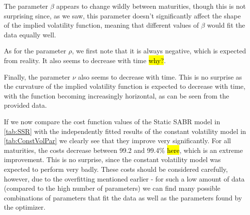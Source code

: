 The parameter $\beta$ appears to change wildly between maturities, though this is not surprising since, as we saw, this parameter doesn't significantly affect the shape of the implied volatility function, meaning that different values of $\beta$ would fit the data equally well.

As for the parameter $\rho$, we first note that it is always negative, which is expected from reality. It also seems to decrease with time \hl{why?}.

Finally, the parameter $\nu$ also seems to decrease with time. This is no surprise as the curvature of the implied volatility function is expected to decrease with time, with the function becoming increasingly horizontal, as can be seen from the provided data.


If we now compare the cost function values of the Static SABR model in \autoref{tab:SSR} with the independently fitted results of the constant volatility model in \autoref{tab:ConstVolPar} we clearly see that they improve very significantly. For all maturities, the costs decrease between 99.2 and 99.4\% \hl{here}, which is an extreme improvement. This is no surprise, since the constant volatility model was expected to perform very badly. These costs should be considered carefully, however, due to the overfitting mentioned earlier - for such a low amount of data (compared to the high number of parameters) we can find many possible combinations of parameters that fit the data as well as the parameters found by the optimizer.


